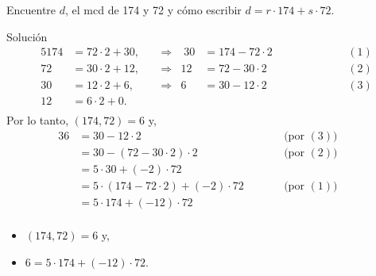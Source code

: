 \documentclass[handout]{beamer} %
\begin{document}
	\begin{frame}
		\begin{ejemplo} Encuentre $d$, el mcd de 174 y 72 y cómo escribir $d = r \cdot 174 + s \cdot 72$.
		\end{ejemplo}
		{\color{blue} Solución}
		\pause 
		\begin{alignat*}5
			174&=72\cdot 2+30,& \;&\Rightarrow&  \; 30 &= 	174-72\cdot 2& &\; &\quad\quad\quad&(1)\\
			72&=30\cdot 2+12,& \;&\Rightarrow& 12&=72-30\cdot 2& \; & \; &&(2) \\
			30&=12\cdot 2+6,& \;&\Rightarrow& 6&=	30-12\cdot 2& \; & \; &&(3)\\
			12&=6\cdot 2+0.& \;&&  && &&\\
		\end{alignat*} \pause \vskip -1.0cm
		Por lo tanto, 	$(174,72) = 6$ y,
		\begin{alignat*}3
			6&=	30-12\cdot 2& &\qquad \text{(por $(3)$)} && \\
			&=	30-(72-30\cdot 2)\cdot 2 & &\qquad \text{(por $(2)$)} && \\  
			&=	5 \cdot 30 + (-2) \cdot 72& &\qquad && \\  
			&= 5 \cdot (	174-72\cdot 2) + (-2) \cdot 72& &\qquad \text{(por $(1)$)}&& \\   
			&=  5\cdot 174+ (-12) \cdot 72&& &&\\  
		\end{alignat*}
		
		\begin{itemize}
			\item 	$(174,72) = 6$ y,
			\item  $6= 5\cdot 174+ (-12) \cdot 72$.
		\end{itemize}
		
		
		
	\end{frame}
	
\end{document}
